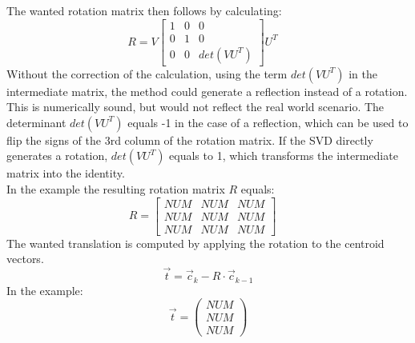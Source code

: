 The wanted rotation matrix then follows by calculating:
\begin{equation*}
    R=V
    \begin{bmatrix}
        1 & 0 & 0 \\
        0 & 1 & 0 \\
        0 & 0 & det(VU^{T})
    \end{bmatrix}U^{T} \quad
\end{equation*}
Without the correction of the calculation, using the term $det(VU^{T})$ in the intermediate matrix, the method could generate a reflection instead of a rotation. This is numerically sound, but would not reflect the real world scenario. The determinant $det(VU^{T})$ equals -1 in the case of a reflection, which can be used to flip the signs of the 3rd column of the rotation matrix. If the SVD directly generates a rotation, $det(VU^{T})$ equals to 1, which transforms the intermediate matrix into the identity.\\
In the example the resulting rotation matrix $R$ equals:
\begin{equation*}
    R=
    \begin{bmatrix}
        NUM & NUM & NUM \\
        NUM & NUM & NUM \\
        NUM & NUM & NUM
    \end{bmatrix} \quad
\end{equation*}
The wanted translation is computed by applying the rotation to the centroid vectors. 
\begin{equation*}
    \vec{t} = \vec{c}_{k}-R\cdot\vec{c}_{k-1}
\end{equation*}
In the example:
\begin{equation*}
    \vec{t} = 
    \begin{pmatrix}
        NUM \\
        NUM \\
        NUM
    \end{pmatrix}
\end{equation*}


